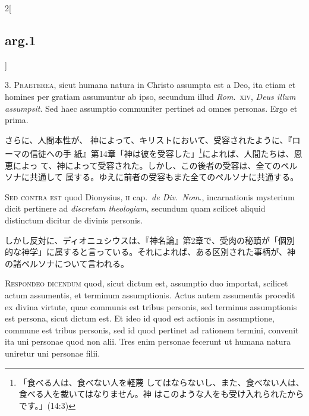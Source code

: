 \documentclass[paper=a4paper,fontsize=10pt,jafontsize=9pt,titlepage]{jlreq}
\begin{document}
\begin{paracol}{2}[\subsection{arg.1}]

3. {\scshape Praeterea}, sicut humana natura in Christo assumpta est a Deo, ita etiam
et homines per gratiam assumuntur ab ipso, secundum illud {\itshape Rom}.~{\scshape xiv}, {\itshape Deus
illum assumpsit}. Sed haec assumptio communiter pertinet ad omnes
personas. Ergo et prima.

\switchcolumn

さらに、人間本性が、
 神によって、キリストにおいて、受容されたように、『ローマの信徒への手
 紙』第14章「神は彼を受容した」\footnote{「食べる人は、食べない人を軽蔑
 してはならないし、また、食べない人は、食べる人を裁いてはなりません。神
 はこのような人をも受け入れられたからです。」(14:3)}によれば、人間たちは、恩恵によっ
 て、神によって受容された。しかし、この後者の受容は、全てのペルソナに共通して
 属する。ゆえに前者の受容もまた全てのペルソナに共通する。

\switchcolumn*[\subsection{s.c.}]

{\scshape Sed contra est} quod Dionysius, {\scshape ii} cap.~{\itshape de Div.~Nom}., incarnationis
mysterium dicit pertinere ad {\itshape discretam theologiam}, secundum quam
scilicet aliquid distinctum dicitur de divinis personis.

\switchcolumn

しかし反対に、ディオニュシウスは、『神名論』第2章で、受肉の秘蹟が「個別
 的な神学」に属すると言っている。それによれば、ある区別された事柄が、神
 の諸ペルソナについて言われる。


{\scshape Respondeo dicendum} quod, sicut dictum est, assumptio duo importat,
scilicet actum assumentis, et terminum assumptionis. Actus autem
assumentis procedit ex divina virtute, quae communis est tribus
personis, sed terminus assumptionis est persona, sicut dictum est. Et
ideo id quod est actionis in assumptione, commune est tribus personis,
sed id quod pertinet ad rationem termini, convenit ita uni personae quod
non alii. Tres enim personae fecerunt ut humana natura uniretur uni
personae filii.


\end{paracol}
\end{document}
